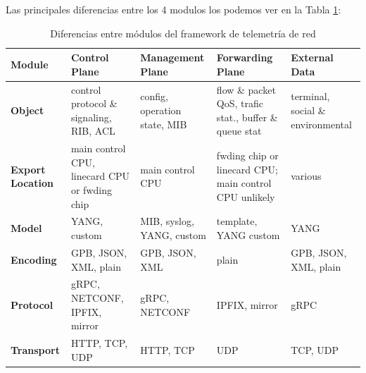 Las principales diferencias entre los 4 modulos los podemos ver en la Tabla \ref{tab:diferencias_modulos_data_objects}:
\begin{table}
    \centering
    \begin{tabular}{|p{2cm}|p{3cm}|p{3cm}|p{3cm}|p{3cm}|}
        \hline
        \textbf{Module} & \textbf{Control Plane} &\textbf{Management Plane} & \textbf{Forwarding Plane} & \textbf{External Data} \\\hline
        
        \textbf{Object} & control protocol \& signaling, RIB, ACL & config, operation state, MIB & flow \& packet QoS, trafic stat., buffer \& queue stat & terminal, social \& environmental\\\hline
        
        \textbf{Export Location }& main control CPU, linecard CPU or fwding chip & main control CPU & fwding chip or linecard CPU; main control CPU unlikely & various \\\hline
        
        \textbf{Model} & YANG, custom & MIB, syslog, YANG, custom & template, YANG custom & YANG\\\hline
        
        \textbf{Encoding} & GPB, JSON, XML, plain & GPB, JSON, XML & plain &  GPB, JSON, XML, plain\\\hline
        
        \textbf{Protocol} & gRPC, NETCONF, IPFIX, mirror & gRPC, NETCONF& IPFIX, mirror & gRPC\\\hline
        
        \textbf{Transport} & HTTP, TCP, UDP & HTTP, TCP & UDP & TCP, UDP \\\hline
        
        
        \end{tabular}

    \caption{Diferencias entre módulos del framework de telemetría de red}
    \label{tab:diferencias_modulos_data_objects}
\end{table}







